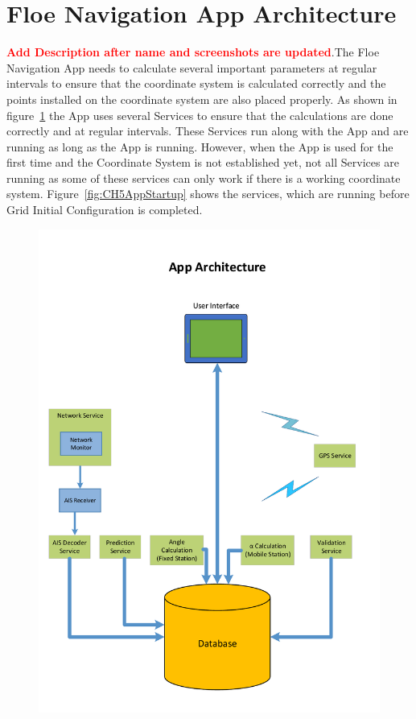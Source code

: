 \section{Floe Navigation App Architecture}
\label{sec:sec5_1}
\noindent
%
\textbf{\textcolor{red}{Add Description after name and screenshots are updated}}.The Floe Navigation App needs to calculate several important parameters at regular intervals to ensure that the coordinate system is calculated correctly and the points installed on the coordinate system are also placed properly. As shown in figure~\ref{fig:CH5AppArchitecture} the App uses several Services to ensure that the calculations are done correctly and at regular intervals.  
These Services run along with the App and are running as long as the App is running. However, when the App is used for the first time and the Coordinate System is not established yet, not all Services are running as some of these services can only work if there is a working coordinate system. Figure~\ref{fig:CH5AppStartup} shows the services, which are running before Grid Initial Configuration is completed.
\begin{figure}[!htb]
	\centering
	\includegraphics[width=.9\textwidth,height=.9\textheight]{fig05/App-Architecture}
	\label{fig:CH5AppArchitecture}
\end{figure}
%
\newpage
